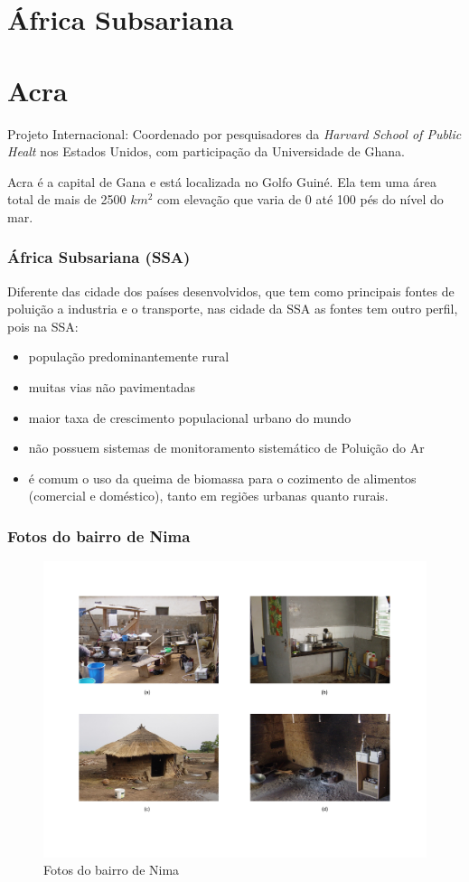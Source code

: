 \section{África Subsariana}

\section{Acra}

Projeto Internacional: Coordenado por pesquisadores da \textit{Harvard School of Public Healt} nos Estados Unidos, 
com participação da Universidade de Ghana.

Acra é a capital  de Gana e está localizada no Golfo Guiné. Ela tem uma área 
total de mais de 2500 $km^2$ com elevação que varia de 0 até 100 pés do nível 
do mar. 

\begin{frame}
 \frametitle{ África Subsariana (SSA)}
  Diferente das cidade dos países desenvolvidos, que tem como principais fontes de poluição
  a industria e o transporte, nas cidade da SSA as fontes tem outro perfil, pois na SSA:
  \begin{itemize}
    \item população predominantemente rural
    \item muitas vias não pavimentadas
    \item maior taxa de crescimento populacional urbano do mundo
    \item não possuem sistemas de monitoramento sistemático de Poluição do Ar
    \item é comum o uso da queima de biomassa para o cozimento de alimentos (comercial e doméstico), tanto em regiões urbanas quanto rurais.
  \end{itemize}
\end{frame}

\begin{frame}
  \frametitle{Fotos do bairro de Nima}
  \begin{figure}[H]
    \centering
    \caption{Fotos do bairro de Nima}
    \includegraphics[scale=0.35]{../../../inputs/zheng_images/nima.pdf}
  \end{figure}
\end{frame}


